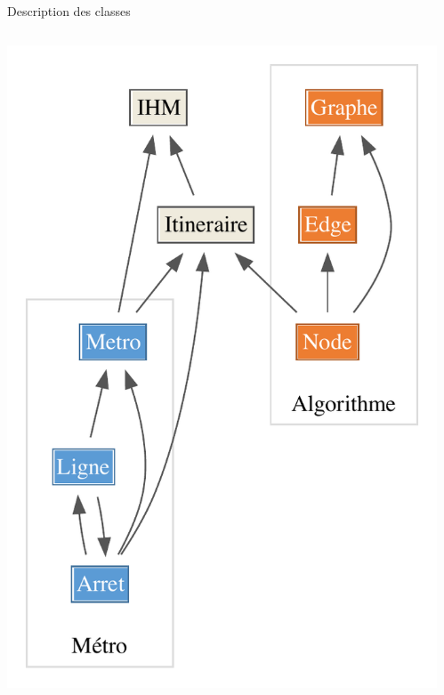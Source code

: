 \documentclass[10pt,xcolor=table,color={dvipsnames,usenames},ignorenonframetext,usepdftitle=false,french]{beamer}
\begin{document}
\begin{frame}{Description des classes}
\protect\hypertarget{description-des-classes-1}{}

\begin{columns}
\begin{column}{0.5\textwidth}

\vspace{0.2cm}
\includegraphics[height=0.95\textheight]{img/Diagramme_classes/diagramme_mini.pdf}
\end{column}

\begin{column}{0.5\textwidth} 


\end{column}
\end{columns}
\end{frame}
\end{document}
